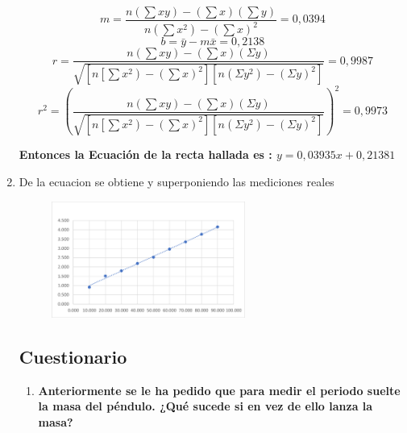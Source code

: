 \begin{enumerate}
\begin{equation*}
     m=\dfrac{n\left(\sum x y\right)-\left(\sum x\right)\left(\sum y\right)}{n\left(\sum x^2\right)-\left(\sum x\right)^2}=0,0394
 \end{equation*}
\begin{equation*}
    b=\bar{y}-m \bar{x}=0,2138
\end{equation*} 
 \begin{equation*}
r=\dfrac{n\left(\sum x y\right)-\left(\sum x\right)(\Sigma y)}{\sqrt{\left[n\left[\sum x^2\right)-\left(\sum x\right)^2\right]\left[n\left(\Sigma y^2\right)-(\Sigma y)^2\right]}}=0,9987
 \end{equation*}
\begin{equation*}
r^2=(\dfrac{n\left(\sum x y\right)-\left(\sum x\right)(\Sigma y)}{\sqrt{\left[n\left[\sum x^2\right)-\left(\sum x\right)^2\right]\left[n\left(\Sigma y^2\right)-(\Sigma y)^2\right]}})^2=0,9973
 \end{equation*}

\textbf{Entonces la Ecuación de la recta hallada es : $y = 0,03935x + 0,21381$}
\item De la ecuacion se obtiene y superponiendo las mediciones reales

\begin{figure}[H]
	\begin{center}
 		\includegraphics[width = 0.6\textwidth]{Imagenes/Imagen3.png}
	\end{center} 
\end{figure}


\subsection{Cuestionario}
\begin{enumerate}
    \item \textbf{Anteriormente se le ha pedido que para medir el periodo suelte la masa del péndulo. ¿Qué sucede si en vez de ello lanza la masa?}


\end{enumerate}
\end{enumerate}
